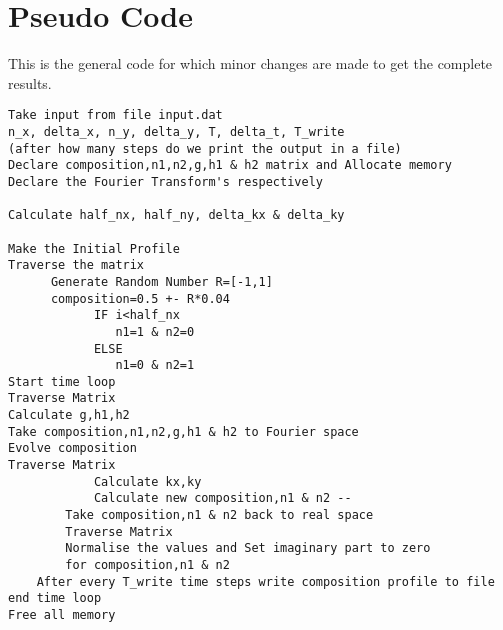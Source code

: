 \chapter{Pseudo Code}
This is the general code for which minor changes are made to get the complete results.
\begin{verbatim}
Take input from file input.dat
n_x, delta_x, n_y, delta_y, T, delta_t, T_write
(after how many steps do we print the output in a file)
Declare composition,n1,n2,g,h1 & h2 matrix and Allocate memory
Declare the Fourier Transform's respectively

Calculate half_nx, half_ny, delta_kx & delta_ky

Make the Initial Profile
Traverse the matrix
      Generate Random Number R=[-1,1]
      composition=0.5 +- R*0.04
			IF i<half_nx
			   n1=1 & n2=0
			ELSE
        	   n1=0 & n2=1
Start time loop
Traverse Matrix
Calculate g,h1,h2
Take composition,n1,n2,g,h1 & h2 to Fourier space
Evolve composition    
Traverse Matrix
        	Calculate kx,ky
        	Calculate new composition,n1 & n2 -- 
    	Take composition,n1 & n2 back to real space
    	Traverse Matrix
        Normalise the values and Set imaginary part to zero 
        for composition,n1 & n2
    After every T_write time steps write composition profile to file
end time loop
Free all memory
\end{verbatim}
